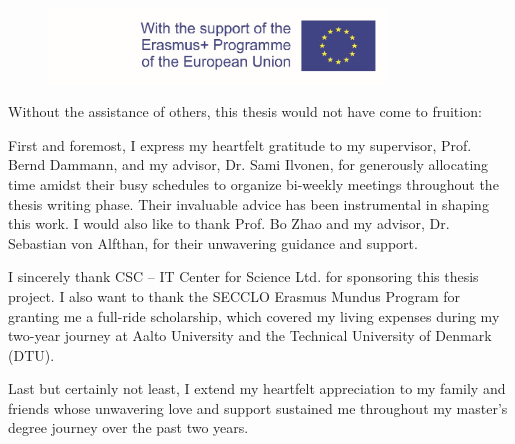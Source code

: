 \begin{figure}[tb]
  \centering
  \includegraphics[width=0.8\textwidth]{figures/EM.pdf}
\end{figure}

Without the assistance of others, this thesis would not have come to fruition:

First and foremost, I express my heartfelt gratitude to my supervisor, Prof. Bernd Dammann, and my advisor, Dr. Sami Ilvonen, for generously allocating time amidst their busy schedules to organize bi-weekly meetings throughout the thesis writing phase. Their invaluable advice has been instrumental in shaping this work. I would also like to thank Prof. Bo Zhao and my advisor, Dr. Sebastian von Alfthan, for their unwavering guidance and support.

I sincerely thank CSC -- IT Center for Science Ltd. for sponsoring this thesis project. I also want to thank the SECCLO Erasmus Mundus Program for granting me a full-ride scholarship, which covered my living expenses during my two-year journey at Aalto University and the Technical University of Denmark (DTU).

Last but certainly not least, I extend my heartfelt appreciation to my family and friends whose unwavering love and support sustained me throughout my master's degree journey over the past two years.
